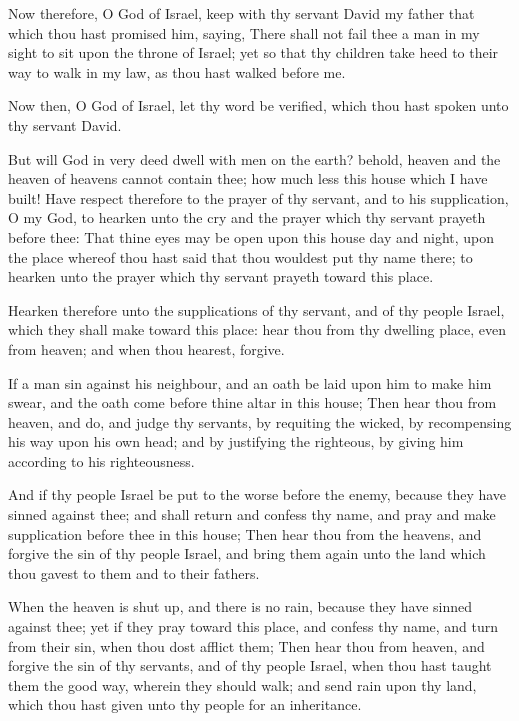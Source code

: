 \verse Now therefore, O \LORD God of Israel, keep with thy servant David my father that which thou hast promised him, saying, There shall not fail thee a man in my sight to sit upon the throne of Israel; yet so that thy children take heed to their way to walk in my law, as thou hast walked before me.

\verse Now then, O \LORD God of Israel, let thy word be verified, which thou hast spoken unto thy servant David.

\verse But will God in very deed dwell with men on the earth? behold, heaven and the heaven of heavens cannot contain thee; how much less this house which I have built!  \verse Have respect therefore to the prayer of thy servant, and to his supplication, O \LORD my God, to hearken unto the cry and the prayer which thy servant prayeth before thee: \verse That thine eyes may be open upon this house day and night, upon the place whereof thou hast said that thou wouldest put thy name there; to hearken unto the prayer which thy servant prayeth toward this place.

\verse Hearken therefore unto the supplications of thy servant, and of thy people Israel, which they shall make toward this place: hear thou from thy dwelling place, even from heaven; and when thou hearest, forgive.

\verse If a man sin against his neighbour, and an oath be laid upon him to make him swear, and the oath come before thine altar in this house; \verse Then hear thou from heaven, and do, and judge thy servants, by requiting the wicked, by recompensing his way upon his own head; and by justifying the righteous, by giving him according to his righteousness.

\verse And if thy people Israel be put to the worse before the enemy, because they have sinned against thee; and shall return and confess thy name, and pray and make supplication before thee in this house; \verse Then hear thou from the heavens, and forgive the sin of thy people Israel, and bring them again unto the land which thou gavest to them and to their fathers.

\verse When the heaven is shut up, and there is no rain, because they have sinned against thee; yet if they pray toward this place, and confess thy name, and turn from their sin, when thou dost afflict them; \verse Then hear thou from heaven, and forgive the sin of thy servants, and of thy people Israel, when thou hast taught them the good way, wherein they should walk; and send rain upon thy land, which thou hast given unto thy people for an inheritance.

